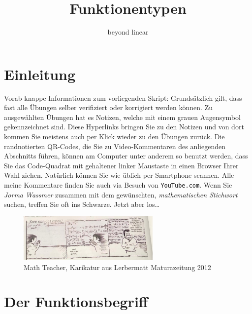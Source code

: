 \documentclass[%
<<<<<<< Updated upstream
11pt,%
twoside,%
titlepage,%
german,%
=======
11pt,%
twoside,%
titlepage,%
swissgerman,%
>>>>>>> Stashed changes
headsepline%
]{scrartcl}
\title{Funktionentypen}
\subtitle{beyond linear}
\author{}
\date{}
\theoremstyle{definition}
\theoremstyle{plain}
\begin{document}
\maketitle
\tableofcontents
\cleardoublepage

\section{Einleitung}

Vorab knappe Informationen zum vorliegenden Skript: Grunds\"atzlich gilt, dass fast alle \"Ubungen selber verifiziert oder korrigiert werden k\"onnen. Zu ausgew\"ahlten \"Ubungen hat es Notizen, welche mit einem grauen Augensymbol gekennzeichnet sind. Diese Hyperlinks bringen Sie zu den Notizen und von dort kommen Sie meistens auch per Klick wieder zu den \"Ubungen zur\"uck. Die randnotierten QR-Codes, die Sie zu Video-Kommentaren des anliegenden Abschnitts f\"uhren,  k\"onnen am Computer unter anderem so benutzt werden, dass Sie das Code-Quadrat mit gehaltener linker Maustaste in einen Browser Ihrer Wahl ziehen. Nat\"urlich k\"onnen Sie wie \"ublich per Smartphone scannen. Alle meine Kommentare finden Sie auch via Besuch von \texttt{YouTube.com}. Wenn Sie \emph{Jorma Wassmer} zusammen mit dem gew\"unschten, \emph{mathematischen Stichwort} suchen, treffen Sie oft ins Schwarze. Jetzt aber los\dots\\

\begin{figure}[htbp]
\begin{center}
	\includegraphics[width=0.618\textwidth]{pictures/teacher_me.jpg}
\caption{Math Teacher, Karikatur aus Lerbermatt Maturazeitung 2012}
\label{default}
\end{center}
\end{figure}


\clearpage

\section{Der Funktionsbegriff}
\end{document}
